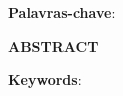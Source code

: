 \setlength{\absparsep}{15pt}%
\begin{resumo}
	\SingleSpacing
	\imprimirresumotcc\space
	 \textbf{Palavras-chave}:\imprimirpalavraschave
	\begin{center}
	    \textbf{ABSTRACT}
	\end{center}
	\SingleSpacing
	\imprimirabstracttcc \space
	\textbf{Keywords}: \imprimirkeywords
	\clearpage
\end{resumo}
\restoregeometry




{%
	\hypersetup{hidelinks}
	
	
	
	
	
	\ifnotempty{\verificasimbolos}{
	}
	
	
}%